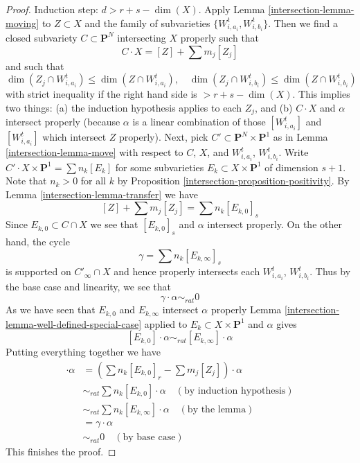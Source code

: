 \begin{proof}
\medskip\noindent
Induction step: $d >  r + s - \dim(X)$. Apply
Lemma \ref{intersection-lemma-moving} to $Z \subset X$ and
the family of subvarieties $\{W_{i, a_i}^t, W_{i, b_i}^t\}$. Then we find a
closed subvariety $C \subset \mathbf{P}^N$ intersecting $X$
properly such that
$$
C \cdot X = [Z] + \sum m_j [Z_j]
$$
and such that
$$
\dim(Z_j \cap W_{i, a_i}^t) \leq \dim(Z \cap W_{i, a_i}^t),\quad
\dim(Z_j \cap W_{i, b_i}^t) \leq \dim(Z \cap W_{i, b_i}^t)
$$
with strict inequality if the right hand side is $> r + s - \dim(X)$.
This implies two things: (a) the induction hypothesis applies to
each $Z_j$, and (b) $C \cdot X$ and $\alpha$ intersect properly (because
$\alpha$ is a linear combination of those $[W_{i, a_i}^t]$ and
$[W_{i, a_i}^t]$ which intersect $Z$ properly).
Next, pick $C' \subset \mathbf{P}^N \times \mathbf{P}^1$
as in Lemma \ref{intersection-lemma-move} with respect to $C$, $X$, and
$W_{i, a_i}^t$, $W_{i, b_i}^t$.
Write $C' \cdot X \times \mathbf{P}^1 = \sum n_k [E_k]$ for
some subvarieties $E_k \subset X \times \mathbf{P}^1$ of
dimension $s + 1$. Note that $n_k > 0$ for all $k$ by
Proposition \ref{intersection-proposition-positivity}.
By Lemma \ref{intersection-lemma-transfer} we have
$$
[Z] + \sum m_j [Z_j] = \sum n_k[E_{k, 0}]_s
$$
Since $E_{k, 0} \subset C \cap X$ we see that $[E_{k, 0}]_s$ and $\alpha$
intersect properly. On the other hand, the cycle
$$
\gamma = \sum n_k[E_{k, \infty}]_s
$$
is supported on $C'_\infty \cap X$ and hence
properly intersects each $W_{i, a_i}^t$, $W_{i, b_i}^t$.
Thus by the base case and linearity, we see that
$$
\gamma \cdot \alpha \sim_{rat} 0
$$
As we have seen that $E_{k, 0}$ and $E_{k, \infty}$
intersect $\alpha$ properly Lemma \ref{intersection-lemma-well-defined-special-case}
applied to $E_k \subset X \times \mathbf{P}^1$ and $\alpha$ gives
$$
[E_{k, 0}] \cdot \alpha \sim_{rat} [E_{k, \infty}] \cdot \alpha
$$
Putting everything together we have
\begin{align*}
[Z] \cdot \alpha
& =
(\sum n_k[E_{k, 0}]_r - \sum m_j[Z_j]) \cdot \alpha \\
& \sim_{rat}
\sum n_k [E_{k, 0}] \cdot \alpha \quad (\text{by induction hypothesis})\\
& \sim_{rat}
\sum n_k [E_{k, \infty}] \cdot \alpha \quad (\text{by the lemma})\\
& =
\gamma \cdot \alpha \\
& \sim_{rat}
0 \quad (\text{by base case})
\end{align*}
This finishes the proof.
\end{proof}

